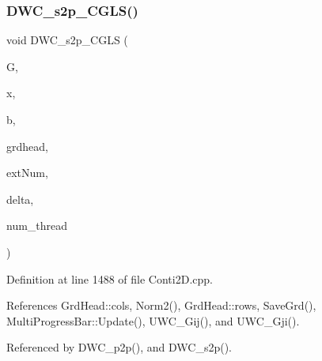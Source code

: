 \subsubsection{D\+W\+C\+\_\+s2p\+\_\+\+C\+G\+L\+S()}
{\footnotesize\ttfamily void D\+W\+C\+\_\+s2p\+\_\+\+C\+G\+LS (\begin{DoxyParamCaption}\item[{double $\ast$$\ast$}]{G,  }\item[{double $\ast$}]{x,  }\item[{double $\ast$}]{b,  }\item[{\textbf{ Grd\+Head}}]{grdhead,  }\item[{int}]{ext\+Num,  }\item[{double}]{delta,  }\item[{int}]{num\+\_\+thread }\end{DoxyParamCaption})}



Definition at line 1488 of file Conti2\+D.\+cpp.



References Grd\+Head\+::cols, Norm2(), Grd\+Head\+::rows, Save\+Grd(), Multi\+Progress\+Bar\+::\+Update(), U\+W\+C\+\_\+\+Gij(), and U\+W\+C\+\_\+\+Gji().



Referenced by D\+W\+C\+\_\+p2p(), and D\+W\+C\+\_\+s2p().


